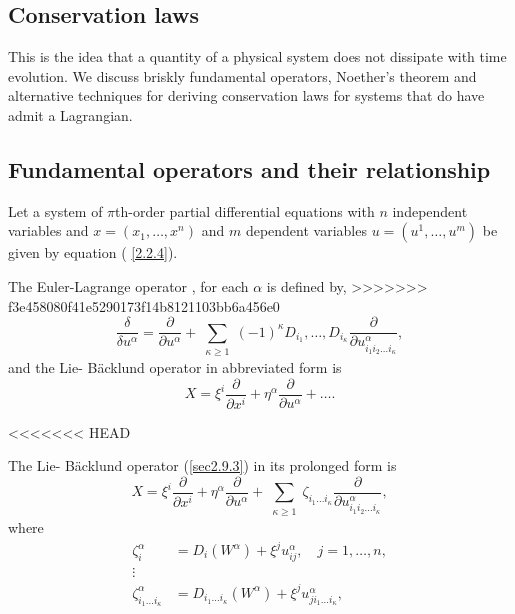 \begin{defn}
\section{Conservation laws}
This is the idea that a quantity of a physical system does not dissipate with  time evolution. We discuss  briskly fundamental operators, Noether's theorem and alternative techniques for  deriving  conservation laws for systems that do have admit a Lagrangian.
\subsection{Fundamental operators and their relationship}
Let a system of $\pi$th-order partial differential equations with $n$ independent variables and $ x= (x_1, \ldots, x^n)$  and  $m$ dependent variables $ u= ( u^1, \ldots, u^m ) $ be given by equation (  \ref{2.2.4}).
\begin{defn} The Euler-Lagrange operator , for each $\alpha$ is defined by,
>>>>>>> f3e458080f41e5290173f14b8121103bb6a456e0
	\begin{equation}
	\frac{ \delta}{ \delta u^{\alpha}} = \frac{ \partial }{ \partial  u^{\alpha}} + \sum_{\substack{  \kappa \geq 1}} (-1)^{\kappa} D_{   i_1}, \ldots, D_{   i_{\kappa}} \frac{ \partial }{ \partial u^{\alpha }_{ i_1i_2\ldots i_{\kappa }}},  \label{sec2.9.1}
	\end{equation} and the  Lie- B\"acklund operator in abbreviated form  \citep{ibragimov} is  \begin{equation}
		X =  \xi^i \frac{ \partial }{ \partial x^i} + \eta^{\alpha}   \frac{ \partial }{ \partial u^{\alpha }}+\ldots. \label{sec2.9.3}
		\end{equation}  
\end{defn}
<<<<<<< HEAD
\begin{rem}The Lie- B\"acklund operator  (\ref{sec2.9.3}) in its prolonged form is \begin{equation}
	X =  \xi^i \frac{ \partial }{ \partial x^i} + \eta^{\alpha}   \frac{ \partial }{ \partial u^{\alpha }}+\sum_{\substack{ \kappa  \geq 1}} \zeta_{i_1\ldots i_{\kappa}} \frac{ \partial }{ \partial u^{\alpha }_{ i_1i_2\ldots i_\kappa}}, \label{sec2.9.4}
	\end{equation} where  \begin{align}
	\zeta_{i}^{\alpha} &= D_i(W^{\alpha})+ \xi^{j} u_{i j }^{\alpha}, \quad j=1,\ldots,n,\\
	\vdots\\
	\zeta_{i_1\ldots i_{\kappa}}^{\alpha}&= D_{i_1 \ldots i_{\kappa} } (W^{\alpha}) + \xi^{j} u_{ j i_1 \ldots i_{\kappa} }^{\alpha}, \,\,  \end{align}

\end{rem}
\end{defn}
